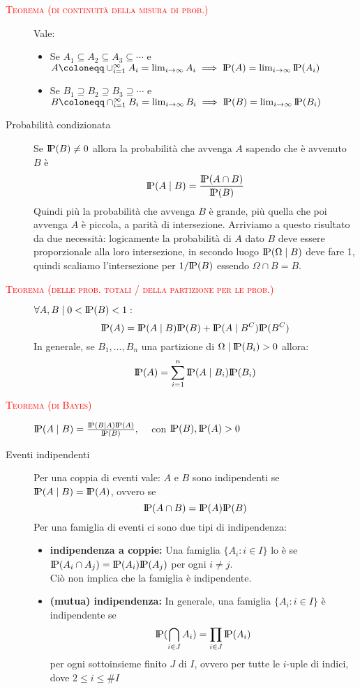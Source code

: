\documentclass[a4paper,10pt]{article}
\newcommand{\myth}{\normalfont \scshape \textcolor{red}} %
\newcommand{\ssubset}{\subseteq}
\newcommand{\pr}{\text{I\kern-0.15em P}} %
\newcommand{\om}{\Omega} %
\theoremstyle{remark}
\theoremstyle{definition}
\begin{document}
\begin{description}
    
    \item[\myth{Teorema (di continuità della misura di prob.)}] Vale:
    \begin{itemize}
        \item Se $A_1 \ssubset A_2 \ssubset A_3 \ssubset \dotsm$  e $A\coloneqq\cup_{i=1}^\infty A_i=\lim_{i \to \infty}A_i \implies \pr(A)=\lim_{i \to \infty}\pr (A_i)$
        \item Se $B_1 \supseteq B_2 \supseteq B_3 \supseteq \dotsm$  e $B\coloneqq\cap_{i=1}^\infty B_i=\lim_{i \to \infty}B_i \implies \pr(B)=\lim_{i \to \infty}\pr (B_i)$
    \end{itemize}
   
    \item[Probabilità condizionata] Se $\pr(B)\ne 0$ allora la probabilità che avvenga $A$ sapendo che è avvenuto $B$ è \[\pr(A\mid B)= \frac{\pr(A \cap B)}{\pr(B)}\] Quindi più la probabilità che avvenga $B$ è grande, più quella che poi avvenga $A$ è piccola, a parità di intersezione. Arriviamo a questo risultato da due necessità: logicamente la probabilità di $A$ dato $B$ deve essere proporzionale alla loro intersezione, in secondo luogo $\pr (\om \mid B)$  deve fare 1, quindi scaliamo l'intersezione per $1/\pr (B)$ essendo $\om \cap B=B$.
   
    \item[\myth{Teorema (delle prob. totali / della partizione per le prob.)}] $\forall A,B \mid 0<\pr(B)<1 :$ \[ \pr(A)=\pr(A\mid B)\pr(B)+\pr(A\mid B^C)\pr(B^C)\]
    In generale, se $B_1,\dots,B_n$ una partizione di $\om \mid \pr(B_i)>0$ allora: \[ \pr(A)=\sum_{i=1}^n \pr(A\mid B_i)\pr(B_i)\]
   
    \item[\myth{Teorema (di Bayes)}] $\pr(A \mid B)=\frac{\pr(B \mid A)\pr(A)}{\pr(B)}, \quad$ con $\pr(B),\pr(A)>0$

    \item[Eventi indipendenti] Per una coppia di eventi vale: $A$ e $B$ sono indipendenti se $\pr(A\mid B)=\pr(A)$, ovvero se \[\pr(A\cap B)=\pr(A)\pr(B)\]
    Per una famiglia di eventi ci sono due tipi di indipendenza:
      \begin{itemize}
        \item \textbf{indipendenza a coppie:} Una famiglia $\{A_i:i\in I\}$ lo è se $\pr(A_i\cap A_j)=\pr(A_i)\pr(A_j)$ per ogni $i \ne j$. \\
    Ciò non implica che la famiglia è indipendente.
        \item \textbf{(mutua) indipendenza:}  In generale, una famiglia $\{A_i:i\in I\}$ è indipendente se
    \[\pr(\bigcap_{i\in J}A_i)=\prod_{i \in J}\pr(A_i)\]
    per ogni sottoinsieme finito $J$ di $I$, ovvero per tutte le $i$-uple di indici, dove $2\le i\le \# I$
    \end{itemize}
   



\end{description}
\end{document}
